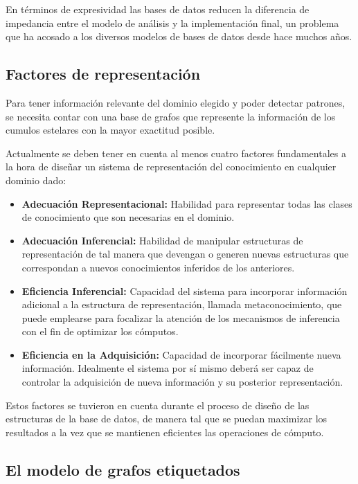 	En términos de expresividad las bases de datos reducen la diferencia de impedancia entre el modelo de análisis y la implementación final, un problema que ha acosado a los diversos modelos de bases de datos desde hace muchos años.
	
	\subsection{Factores de representación}
	
	Para tener información relevante del dominio elegido y poder detectar patrones, se necesita contar con una base de grafos que represente la información de los cumulos estelares con la mayor exactitud posible.
	
	Actualmente se deben tener en cuenta al menos cuatro factores fundamentales a la hora de diseñar un sistema de representación del conocimiento en cualquier dominio dado\cite{van2008handbook}:
	
	\begin{itemize}
		\item \textbf{Adecuación Representacional:} Habilidad para representar todas las clases de conocimiento que son necesarias en el dominio.
		\item \textbf{Adecuación Inferencial:} Habilidad de manipular estructuras de representación de tal manera que devengan o generen nuevas estructuras que correspondan a nuevos conocimientos inferidos de los anteriores.
		\item \textbf{Eficiencia Inferencial:} Capacidad del sistema para incorporar información adicional a la estructura de representación, llamada metaconocimiento, que puede emplearse para focalizar la atención de los mecanismos de inferencia con el fin de optimizar los cómputos.
		\item \textbf{Eficiencia en la Adquisición:} Capacidad de incorporar fácilmente nueva información. Idealmente el sistema por sí mismo deberá ser capaz de controlar la adquisición de nueva información y su posterior representación.
	\end{itemize}
	
	Estos factores se tuvieron en cuenta durante el proceso de diseño de las estructuras de la base de datos, de manera tal que se puedan maximizar los resultados a la vez que se mantienen eficientes las operaciones de cómputo.
	
	\subsection{El modelo de grafos etiquetados}
	

